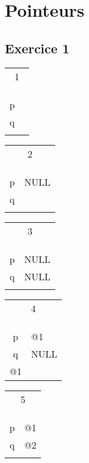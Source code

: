 \section{Pointeurs}
\subsection{Exercice 1}


\begin{tabular}{c|p{1cm}|}
	\multicolumn{2}{c|}{1}\\
	&\\
	\hline
	&\\	
	\hline
	&\\
	\hline
	p&\\
	\hline
	q&\\
	\hline
	&\\	
	\hline
\end{tabular}
\begin{tabular}{c|p{1cm}|}
	\multicolumn{2}{c|}{2}\\
	&\\
	\hline
	&\\	
	\hline
	&\\
	\hline
	p&NULL\\
	\hline
	q&\\
	\hline
	&\\	
	\hline
\end{tabular}
\begin{tabular}{c|p{1cm}|}
	\multicolumn{2}{c|}{3}\\
	&\\
	\hline
	&\\	
	\hline
	&\\
	\hline
	p&NULL\\
	\hline
	q&NULL\\
	\hline
	&\\	
	\hline
\end{tabular}
\begin{tabular}{c|p{1cm}|}
	\multicolumn{2}{c|}{4}\\
	&\\
	\hline
	&\\	
	\hline
	&\\
	\hline
	p&@1\\
	\hline
	q&NULL\\
	\hline
	@1&\\	
	\hline
\end{tabular}
\begin{tabular}{c|p{1cm}|}
	\multicolumn{2}{c|}{5}\\
	&\\
	\hline
	&\\	
	\hline
	&\\
	\hline
	p&@1\\
	\hline
	q&@2\\
	\hline
	&\\	
	\hline
\end{tabular}
